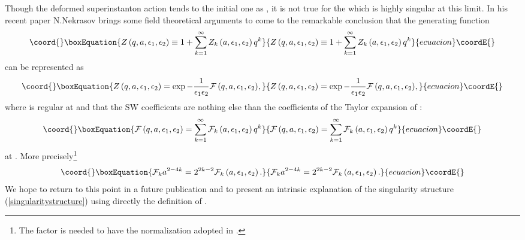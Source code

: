 \documentclass[a4paper,12pt]{article}
\begin{document}
Though the deformed superinstanton action \coordHE{} tends to the initial one as \coordHE{}, it is not true for the \coordHE{} which is highly singular at this limit. In his recent
paper N.Nekrasov \cite{N} brings some field theoretical arguments
to come to the remarkable conclusion that the generating function
\begin{equation}\coord{}\boxEquation{
Z\left(q, a, \epsilon_1, \epsilon_2 \right)\equiv 1+\sum_{k=1}^{\infty} Z_k\left(a, \epsilon_1, \epsilon_2
\right)q^k \label{generatingZ}
}{
Z\left(q, a, \epsilon_1, \epsilon_2 \right)\equiv 1+\sum_{k=1}^{\infty} Z_k\left(a, \epsilon_1, \epsilon_2
\right)q^k }{ecuacion}\coordE{}\end{equation}
can be represented as
\begin{equation}\coord{}\boxEquation{
Z\left(q, a, \epsilon_1, \epsilon_2
\right)=\exp{-\frac{1}{\epsilon_1 \epsilon_2}{\cal F}\left(q, a,
\epsilon_1, \epsilon_2 \right)}, \label{singularitystructure}
}{
Z\left(q, a, \epsilon_1, \epsilon_2
\right)=\exp{-\frac{1}{\epsilon_1 \epsilon_2}{\cal F}\left(q, a,
\epsilon_1, \epsilon_2 \right)}, }{ecuacion}\coordE{}\end{equation}
where \coordHE{} is regular at \coordHE{} and
that the SW coefficients \coordHE{} are nothing else than the
coefficients of the Taylor expansion of \coordHE{}:
\begin{equation}\coord{}\boxEquation{
{\cal F}\left(q, a, \epsilon_1, \epsilon_2 \right)=\sum_{k=1}^{\infty}{\cal F}_k\left(a, \epsilon_1, \epsilon_2
\right)q^k \label{TaylorF}
}{
{\cal F}\left(q, a, \epsilon_1, \epsilon_2 \right)=\sum_{k=1}^{\infty}{\cal F}_k\left(a, \epsilon_1, \epsilon_2
\right)q^k }{ecuacion}\coordE{}\end{equation}
at \coordHE{}. More precisely\footnote{The factor
\coordHE{} is needed to have the normalization adopted in
\cite{dorey1}.}
\begin{equation}\coord{}\boxEquation{
{\cal F}_k a^{2-4k} =2^{2k-2}{\cal F}_k\left(a, \epsilon_1, \epsilon_2 \right).
}{
{\cal F}_k a^{2-4k} =2^{2k-2}{\cal F}_k\left(a, \epsilon_1, \epsilon_2 \right).
}{ecuacion}\coordE{}\end{equation}
We hope to return to this point in a future publication and to
present an intrinsic explanation of the singularity structure
(\ref{singularitystructure}) using directly the definition of
\coordHE{}.
\end{document}
